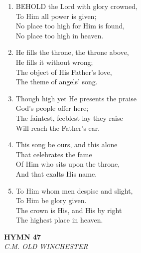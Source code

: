 \begin{enumerate}
    \item BEHOLD the Lord with glory crowned, \\
        To Him all power is given; \\
        No place too high for Him is found, \\
        No place too high in heaven.

    \item He fills the throne, the throne above, \\
        He fills it without wrong; \\
        The object of His Father's love, \\
        The theme of angels' song.

    \item Though high yet He presents the praise \\
        God's people offer here; \\
        The faintest, feeblest lay they raise \\
        Will reach the Father's ear.

    \item This song be ours, and this alone \\
        That celebrates the fame \\
        Of Him who sits upon the throne, \\
        And that exalts His name.

    \item To Him whom men despise and slight, \\
        To Him be glory given. \\
        The crown is His, and His by right \\
        The highest place in heaven.

\end{enumerate}

\newpage
\begin{center}
    {\Large \textbf{HYMN 47}}
    \\
    \textit{C.M. OLD WINCHESTER}
\end{center}
\vspace{1em}

